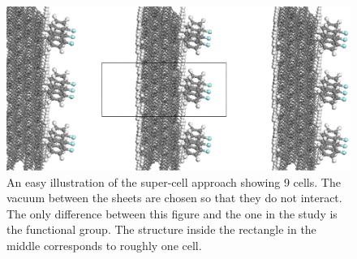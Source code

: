 \documentclass[12pt,a4paper]{article}
\begin{document}
\begin{figure} \captionsetup{width=.8\linewidth} \caption{An easy illustration of the super-cell approach showing 9 cells. The vacuum between the sheets are chosen so that they do not interact. The only difference between this figure and the one in the study is the functional group. The structure inside the rectangle in the middle corresponds to roughly one cell.} \label{supercell}
%
\includegraphics[width=.8\linewidth]{pictures/supercellvacuum.png}
\end{figure}

\printbibliography
\end{document}
